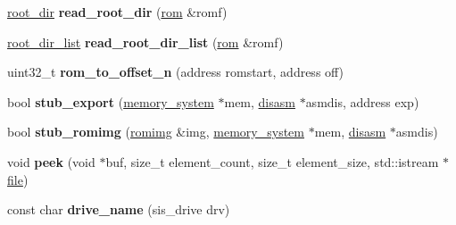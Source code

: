 \begin{DoxyCompactItemize}
\item 
\mbox{\label{namespaceeka2l1_1_1loader_ac4359590afaca2c699e3acf7a7db7061}} 
\mbox{\hyperlink{structeka2l1_1_1loader_1_1root__dir}{root\+\_\+dir}} {\bfseries read\+\_\+root\+\_\+dir} (\mbox{\hyperlink{structeka2l1_1_1loader_1_1rom}{rom}} \&romf)
\item 
\mbox{\label{namespaceeka2l1_1_1loader_a50eb91bbd42c1462e0f2929e983714f8}} 
\mbox{\hyperlink{structeka2l1_1_1loader_1_1root__dir__list}{root\+\_\+dir\+\_\+list}} {\bfseries read\+\_\+root\+\_\+dir\+\_\+list} (\mbox{\hyperlink{structeka2l1_1_1loader_1_1rom}{rom}} \&romf)
\item 
\mbox{\label{namespaceeka2l1_1_1loader_a27e5a51143954e736fbddfc7029d30c8}} 
uint32\+\_\+t {\bfseries rom\+\_\+to\+\_\+offset\+\_\+n} (address romstart, address off)
\item 
\mbox{\label{namespaceeka2l1_1_1loader_ae75eeeaa0ca8970353a6dcd1372d3ae2}} 
bool {\bfseries stub\+\_\+export} (\mbox{\hyperlink{classeka2l1_1_1memory__system}{memory\+\_\+system}} $\ast$mem, \mbox{\hyperlink{classeka2l1_1_1disasm}{disasm}} $\ast$asmdis, address exp)
\item 
\mbox{\label{namespaceeka2l1_1_1loader_a794ad285ec4dc5b78c43de1b7a49f255}} 
bool {\bfseries stub\+\_\+romimg} (\mbox{\hyperlink{structeka2l1_1_1loader_1_1romimg}{romimg}} \&img, \mbox{\hyperlink{classeka2l1_1_1memory__system}{memory\+\_\+system}} $\ast$mem, \mbox{\hyperlink{classeka2l1_1_1disasm}{disasm}} $\ast$asmdis)
\item 
\mbox{\label{namespaceeka2l1_1_1loader_ac798e63cccce95ee61f2270ef589d93f}} 
void {\bfseries peek} (void $\ast$buf, size\+\_\+t element\+\_\+count, size\+\_\+t element\+\_\+size, std\+::istream $\ast$\mbox{\hyperlink{structeka2l1_1_1file}{file}})
\item 
\mbox{\label{namespaceeka2l1_1_1loader_a09448d63fc5308b7fd83cc73de7373df}} 
const char {\bfseries drive\+\_\+name} (sis\+\_\+drive drv)
\item 
\mbox{\label{namespaceeka2l1_1_1loader_a85feefb1da00907438af80850f5ef040}} 

\end{DoxyCompactItemize}
